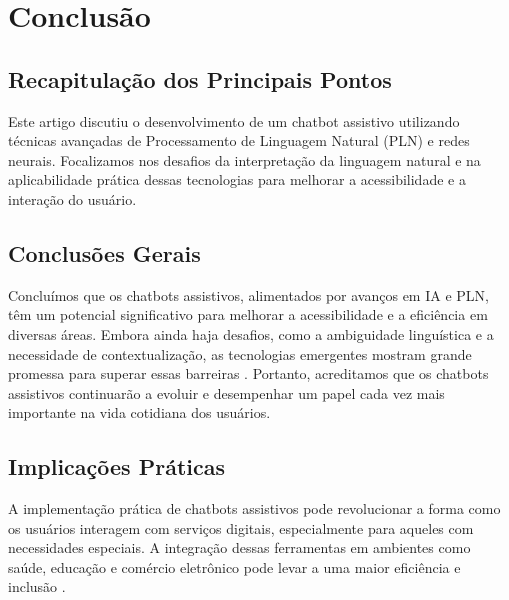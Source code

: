\documentclass[conference]{IEEEtran}
\begin{document}


\section{Conclusão}

\subsection{Recapitulação dos Principais Pontos}
Este artigo discutiu o desenvolvimento de um chatbot assistivo utilizando técnicas avançadas de 
Processamento de Linguagem Natural (PLN) e redes neurais.
Focalizamos nos desafios da interpretação da linguagem natural e na aplicabilidade prática 
dessas tecnologias para melhorar a acessibilidade e a interação do usuário.

\subsection{Conclusões Gerais}
Concluímos que os chatbots assistivos, alimentados por avanços em IA e PLN, 
têm um potencial significativo para melhorar a acessibilidade e a eficiência em diversas áreas. 
Embora ainda haja desafios, como a ambiguidade linguística e a necessidade de contextualização, 
as tecnologias emergentes mostram grande promessa para superar essas barreiras \cite{Young2018}.
Portanto, acreditamos que os chatbots assistivos continuarão a evoluir e
desempenhar um papel cada vez mais importante na vida cotidiana dos usuários.

\subsection{Implicações Práticas}
A implementação prática de chatbots assistivos pode revolucionar a forma como os usuários interagem 
com serviços digitais, especialmente para aqueles com necessidades especiais. 
A integração dessas ferramentas em ambientes como saúde, educação e comércio eletrônico pode 
levar a uma maior eficiência e inclusão \cite{McTear2016}.


\end{document}
